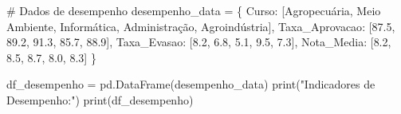 \documentclass[
  12pt,
  letterpaper,
]{report}
\newenvironment{Shaded}{\begin{snugshade}}{\end{snugshade}}
\newcommand{\BuiltInTok}[1]{\textcolor[rgb]{0.00,0.23,0.31}{#1}}
\newcommand{\CommentTok}[1]{\textcolor[rgb]{0.37,0.37,0.37}{#1}}
\newcommand{\FloatTok}[1]{\textcolor[rgb]{0.68,0.00,0.00}{#1}}
\newcommand{\NormalTok}[1]{\textcolor[rgb]{0.00,0.23,0.31}{#1}}
\newcommand{\OperatorTok}[1]{\textcolor[rgb]{0.37,0.37,0.37}{#1}}
\newcommand{\StringTok}[1]{\textcolor[rgb]{0.13,0.47,0.30}{#1}}
\begin{document}
\begin{Shaded}
\begin{Highlighting}[]
\CommentTok{\# Dados de desempenho}
\NormalTok{desempenho\_data }\OperatorTok{=}\NormalTok{ \{}
    \StringTok{\textquotesingle{}Curso\textquotesingle{}}\NormalTok{: [}\StringTok{\textquotesingle{}Agropecuária\textquotesingle{}}\NormalTok{, }\StringTok{\textquotesingle{}Meio Ambiente\textquotesingle{}}\NormalTok{, }\StringTok{\textquotesingle{}Informática\textquotesingle{}}\NormalTok{, }\StringTok{\textquotesingle{}Administração\textquotesingle{}}\NormalTok{, }\StringTok{\textquotesingle{}Agroindústria\textquotesingle{}}\NormalTok{],}
    \StringTok{\textquotesingle{}Taxa\_Aprovacao\textquotesingle{}}\NormalTok{: [}\FloatTok{87.5}\NormalTok{, }\FloatTok{89.2}\NormalTok{, }\FloatTok{91.3}\NormalTok{, }\FloatTok{85.7}\NormalTok{, }\FloatTok{88.9}\NormalTok{],}
    \StringTok{\textquotesingle{}Taxa\_Evasao\textquotesingle{}}\NormalTok{: [}\FloatTok{8.2}\NormalTok{, }\FloatTok{6.8}\NormalTok{, }\FloatTok{5.1}\NormalTok{, }\FloatTok{9.5}\NormalTok{, }\FloatTok{7.3}\NormalTok{],}
    \StringTok{\textquotesingle{}Nota\_Media\textquotesingle{}}\NormalTok{: [}\FloatTok{8.2}\NormalTok{, }\FloatTok{8.5}\NormalTok{, }\FloatTok{8.7}\NormalTok{, }\FloatTok{8.0}\NormalTok{, }\FloatTok{8.3}\NormalTok{]}
\NormalTok{\}}

\NormalTok{df\_desempenho }\OperatorTok{=}\NormalTok{ pd.DataFrame(desempenho\_data)}
\BuiltInTok{print}\NormalTok{(}\StringTok{"Indicadores de Desempenho:"}\NormalTok{)}
\BuiltInTok{print}\NormalTok{(df\_desempenho)}
\end{Highlighting}
\end{Shaded}
\end{document}
